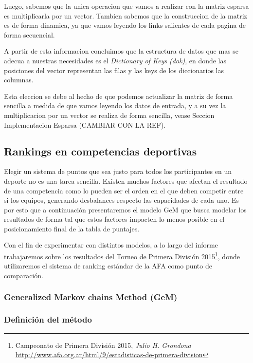 Luego, sabemos que la unica operacion que vamos a realizar con la matriz esparsa es multiplicarla por un vector. Tambien sabemos que la
construccion de la matriz es de forma dinamica, ya que vamos leyendo los links salientes de cada pagina de forma secuencial.

A partir de esta informacion concluimos que la estructura de datos que mas se adecua a nuestras necesidades es el \textit{Dictionary
of Keys (dok)}, en donde las posiciones del vector representan las filas y las keys de los diccionarios las columnas.

Esta eleccion se debe al hecho de que podemos actualizar la matriz de forma sencilla a medida de que vamos leyendo los datos de entrada, y a su vez
 la multiplicacion por un vector se realiza de forma sencilla, vease Seccion Implementacion Esparsa (CAMBIAR CON LA REF).


\subsection{Rankings en competencias deportivas}

Elegir un sistema de puntos que sea justo para todos los participantes en un
deporte no es una tarea sencilla. Existen muchos factores que afectan el
resultado de una competencia como lo pueden ser el orden en el que deben
competir entre si los equipos, generando desbalances respecto las capacidades de
cada uno. Es por esto que a continuación presentaremos el modelo GeM\cite{Govan2008}
 que busca modelar los resultados de forma tal que estos
factores impacten lo menos posible en el posicionamiento final de la tabla de
puntajes.

Con el fin de experimentar con distintos modelos, a lo largo del informe
trabajaremos sobre los resultados del Torneo de Primera División
2015\footnote{Campeonato de Primera División 2015, \textit{Julio H. Grondona} \\
\url{http://www.afa.org.ar/html/9/estadisticas-de-primera-division}}, donde
utilizaremos el sistema de ranking estándar de la AFA como punto de comparación.

\subsubsection{Generalized Markov chains Method (GeM)}
\label{sec:gem_model}

\subsubsection*{Definición del método}

